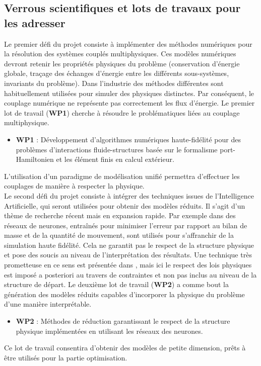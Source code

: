 \documentclass[12pt, french]{article}
\begin{document}
\subsection{Verrous scientifiques et lots de travaux pour les adresser}
Le premier défi du projet consiste à implémenter des méthodes numériques pour la résolution des systèmes couplés multiphysiques. Ces modèles numériques devront retenir les propriétés physiques du problème (conservation d’énergie globale, traçage des échanges d’énergie entre les différents sous-systèmes, invariants du problème). Dans l'industrie des méthodes différentes sont habituellement utilisées pour simuler des physiques distinctes. Par conséquent, le couplage numérique ne représente pas correctement les flux d’énergie. Le premier lot de travail (\textbf{WP1}) cherche à résoudre le problématiques liées au couplage multiphysique. 
\begin{itemize}
	\item \textbf{WP1} : Développement d'algorithmes numériques haute-fidélité pour des problèmes d'interactions fluide-structures basée sur le formalisme port-Hamiltonien et les élément finis en calcul extérieur.
\end{itemize}
L’utilisation d’un paradigme de modélisation unifié permettra d’effectuer les couplages de manière à respecter la physique.\\

Le second défi du projet consiste à intégrer des techniques issues de l'Intelligence
Artificielle, qui seront utilisées pour obtenir des modèles réduits. Il s'agit d'un thème de recherche récent mais en expansion rapide. Par exemple dans \cite{sun2020physics} des réseaux de neurones, entraînés pour minimiser l'erreur par rapport au bilan de masse et de la quantité de mouvement, sont utilisés pour s'affranchir de la simulation haute fidélité. Cela ne garantit pas le respect de la structure physique et pose des soucis au niveau de l'interprétation des résultats. Une technique très prometteuse en ce sens est présentée dans \cite{lee2020}, mais ici le respect des lois physiques est imposé a posteriori au travers de contraintes et non pas inclus au niveau de la structure de départ. Le deuxième lot de travail (\textbf{WP2}) a comme bout la génération des modèles réduits capables d'incorporer la physique du problème d'une manière interprétable.
\begin{itemize}
	\item \textbf{WP2} : Méthodes de réduction garantissant le respect de la structure physique implémentées en utilisant les réseaux des neurones.
\end{itemize}
Ce lot de travail consentira d'obtenir des modèles de petite dimension, prêts à être utilisés pour la partie optimisation.\\ 
\end{document}
